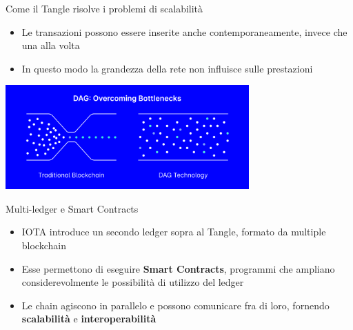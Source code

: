 \documentclass[xcolor=dvipsnames]{beamer}
\begin{document}
\begin{frame}{Come il Tangle risolve i problemi di scalabilità}
    \linespread{1.5}
    \begin{itemize}
        \item Le transazioni possono essere inserite anche contemporaneamente, invece che una alla volta
        \item In questo modo la grandezza della rete non influisce sulle prestazioni
    \end{itemize}
    \vfill
    \centering
    \includegraphics[width=0.7\textwidth]{figures/blockchain_bottleneck.png}
\end{frame}

\begin{frame}{Multi-ledger e Smart Contracts}
    \linespread{1.5}
    \begin{itemize}
        \item IOTA introduce un secondo ledger sopra al Tangle, formato da multiple blockchain
        \vfill
        \item Esse permettono di eseguire \textbf{Smart Contracts}, programmi che ampliano considerevolmente le possibilità di utilizzo del ledger
        \vfill
        \item Le chain agiscono in parallelo e possono comunicare fra di loro, fornendo \textbf{scalabilità} e \textbf{interoperabilità}
    \end{itemize}
\end{frame}
\end{document}
